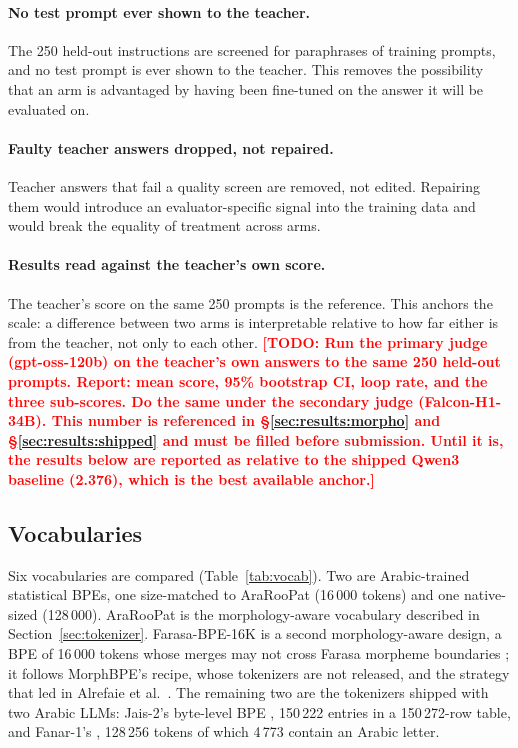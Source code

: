 \documentclass[a4paper,fleqn]{cas-sc}
\newcommand{\todo}[1]{\textcolor{red}{\textbf{[\textsc{TODO}: #1]}}}
\begin{document}
\paragraph{No test prompt ever shown to the teacher.} The 250 held-out instructions are screened for paraphrases of training prompts, and no test prompt is ever shown to the teacher. This removes the possibility that an arm is advantaged by having been fine-tuned on the answer it will be evaluated on.

\paragraph{Faulty teacher answers dropped, not repaired.} Teacher answers that fail a quality screen are removed, not edited. Repairing them would introduce an evaluator-specific signal into the training data and would break the equality of treatment across arms.

\paragraph{Results read against the teacher's own score.}
The teacher's score on the same 250 prompts is the reference. This anchors the scale: a difference between two arms is interpretable relative to how far either is from the teacher, not only to each other.
\todo{Run the primary judge (gpt-oss-120b) on the teacher's own answers to the same 250 held-out prompts. Report: mean score, 95\% bootstrap CI, loop rate, and the three sub-scores. Do the same under the secondary judge (Falcon-H1-34B). This number is referenced in \S\ref{sec:results:morpho} and \S\ref{sec:results:shipped} and must be filled before submission. Until it is, the results below are reported as relative to the shipped Qwen3 baseline (2.376), which is the best available anchor.}

\subsection{Vocabularies}
\label{sec:protocol:vocab}

Six vocabularies are compared (Table~\ref{tab:vocab}). Two are Arabic-trained statistical BPEs, one size-matched to AraRooPat (16\,000 tokens) and one native-sized (128\,000). AraRooPat is the morphology-aware vocabulary described in Section~\ref{sec:tokenizer}. Farasa-BPE-16K is a second morphology-aware design, a BPE of 16\,000 tokens whose merges may not cross Farasa morpheme boundaries \citep{abdelali2016farasa}; it follows MorphBPE's recipe, whose tokenizers are not released, and the strategy that led in Alrefaie et al.\ \citep{alrefaie2024exploring}. The remaining two are the tokenizers shipped with two Arabic LLMs: Jais-2's byte-level BPE \citep{anwar2026jais2}, 150\,222 entries in a 150\,272-row table, and Fanar-1's \citep{fanar2025}, 128\,256 tokens of which 4\,773 contain an Arabic letter.
\end{document}
